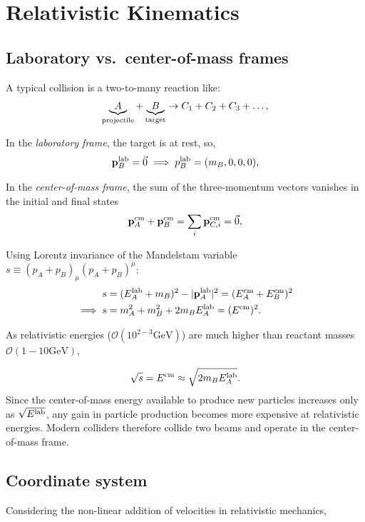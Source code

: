 \chapter{Relativistic Kinematics}
\label{app:kinematics}
\section{Laboratory vs.\ center-of-mass frames}
A typical collision is a two-to-many reaction like:
\begin{equation}
	\underbrace{A}_{\rm projectile} + \underbrace{B}_{\rm target} \rightarrow C_1 + C_2 + C_3 + \ldots,
\end{equation}

In the \emph{laboratory frame}, the target is at rest, so,
\begin{equation}
	\mathbf{p}_B^{\rm lab} = \vec{0} \implies p_{B}^{\rm lab} = (m_B, 0, 0, 0),
\end{equation}

In the \emph{center-of-mass frame}, the sum of the three-momentum vectors vanishes in the initial and final states
\begin{equation}
	\mathbf{p}_A^{\rm cm} + \mathbf{p}_B^{\rm cm} =\sum_i \mathbf{p}_{C, i}^{\rm cm} = \vec{0},
\end{equation}

Using Lorentz invariance of the Mandelstam variable \(s \equiv (p_A + p_B)_\mu(p_A + p_B)^\mu\):
\begin{align}
	s &= (E^{\rm lab}_A + m_B)^2 - |\mathbf{p}^{\rm lab}_A|^2 = (E^{\rm cm}_A + E^{\rm cm}_B)^2 \notag \\
	\implies s &= m_A^2 + m_B^2  + 2m_BE^{\rm lab}_A = (E^{\rm cm})^2. 
\end{align}

As relativistic energies (\(\mathcal{O}(10^{2-3} \mathrm{GeV})\)) are much higher than reactant masses \(\mathcal{O}(1-10 \mathrm{GeV})\), 

\begin{equation}
	\sqrt{s} = E^{\rm cm} \approx \sqrt{2m_BE^{\rm lab}_A}.
\end{equation}
Since the center-of-mass energy available to produce new particles increases only as \(\sqrt{E^{\rm lab}}\), any gain in particle production becomes more expensive at relativistic energies. Modern colliders therefore collide two beams and operate in the center-of-mass frame.

\section{Coordinate system}
\label{sec:coordSysAppendix}
Considering the non-linear addition of velocities in relativistic mechanics,

